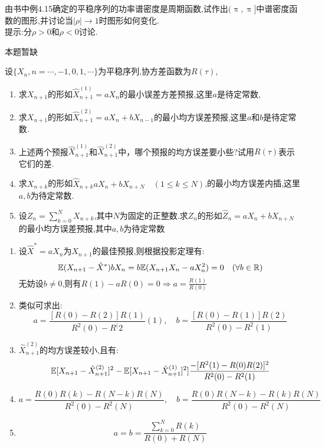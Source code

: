 \begin{problem}{4.30}
由书中例4.15确定的平稳序列的功率谱密度是周期函数,试作出$(\uppi,\uppi]$中谱密度函数的图形,并讨论当$|\rho|\to 1$时图形如何变化.\\
提示:分$\rho>0$和$\rho<0$讨论.
\end{problem}
\begin{solution}
	本题暂缺
\end{solution}

\begin{problem}{4.31}
设$\{X_n, n=\cdots ,-1,0,1,\cdots \}$为平稳序列,协方差函数为$R(\tau)$,
\begin{enumerate}[label=(\arabic*)]
	\item 求$X_{n+1}$的形如$\hat{X}_{n+1}^{(1)}=aX_n$的最小误差方差预报,这里$a$是待定常数,
	\item 求$X_{n+1}$的形如$\hat{X}_{n+1}^{(2)}=aX_n+bX_{n-1}$的最小均方误差预报,这里$a$和$b$是待定常数.
	\item 上述两个预报$\hat{X}_{n+1}^{(1)}$和$\hat{X}_{n+1}^{(2)}$中，哪个预报的均方误差要小些?试用$R(\tau)$表示它们的差.
	\item 求$X_{n+k}$的形如$\hat{X}_{n+k}aX_n+bX_{n+N}\quad (1\leqslant k\leqslant N)$,的最小均方误差内插,这里$a,b$为待定常数.
	\item 设$\displaystyle Z_n = \sum_{k=0}^{N}X_{n+k}$,其中$N$为固定的正整数.求$Z_n$的形如$\hat{Z}_n = aX_n+bX_{n+N}$的最小均方误差预报,其中$a,b$为待定常数
\end{enumerate}
\end{problem}
\begin{solution}
	\begin{enumerate}[label=(\arabic*)]
		\item 设$\hat{X}^{*}=aX_n$为$X_{n+1}$的最佳预报,则根据投影定理有:
		      \[\mathbb{E}(X_{n+1}-\hat{X}^{*})bX_n = b\mathbb{E}(X_{n+1}X_n-aX_n^2)=0 \quad (\forall b\in \mathbb{R})\]
		      无妨设$b\neq 0$,则有$R(1)-aR(0)=0\Rightarrow a=\frac{R(1)}{R(0)}$
		\item 类似可求出:\[a=\frac{[R(0)-R(2)]R(1)}{R^2(0)-R^(2}(1),\quad b=\frac{[R(0)-R(1)]R(2)}{R^2(0)-R^2(1)}\]
		\item $\hat{X}_{n+1}^{(2)}$的均方误差较小,且有:
		      \[\mathbb{E}[X_{n+1}-\hat{X}_{n+1}^{(2)}]^2-\mathbb{E}[X_{n+1}-\hat{X}_{n+1}^{(1)}]^2 ] \frac{-[R^2(1)-R(0)R(2)]^2}{R^2(0)-R^2(1)}\]
		\item \[a=\frac{R(0)R(k)-R(N-k)R(N)}{R^2(0)-R^2(N)},\quad b=\frac{R(0)R(N-k)-R(k)R(N)}{R^2(0)-R^2(N)}\]
		\item \[a=b=\frac{\sum_{k=0}^{N}R(k)}{R(0)+R(N)}\]
	\end{enumerate}
\end{solution}

